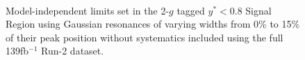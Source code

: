 \begin{figure}[!htb]
{            }\\
            \caption{Model-independent limits set in the 2-$g$ tagged $y^{*} < 0.8$ Signal Region using Gaussian resonances of varying widths from 0\% to 15\% of their peak position without systematics included using the full 139fb$^{-1}$ Run-2 dataset.}
            \label{fig:SignalIndependentGaussianLimits_2gYStar0p8}
        \end{figure}


